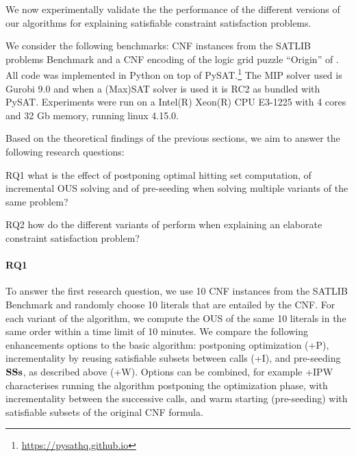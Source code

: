 We now experimentally validate the the performance of the different versions of our algorithms for explaining satisfiable constraint satisfaction problems.

We consider the following benchmarks: CNF instances from the SATLIB problems Benchmark \cite{hoos2000satlib} and a CNF encoding of the logic grid puzzle ``Origin'' of \citet{ecai/BogaertsGCG20}. All code was implemented in Python on top of %
PySAT.\footnote{\url{https://pysathq.github.io}} The MIP solver used is Gurobi 9.0 and when a (Max)SAT solver is used it is RC2 as bundled with PySAT. Experiments were run on a Intel(R) Xeon(R) CPU E3-1225 with 4 cores and 32 Gb memory, running linux 4.15.0.

Based on the theoretical findings of the previous sections, we aim to answer the following research questions:
\begin{compactdesc}
\item[RQ1] what is the effect of postponing optimal hitting set computation, of incremental OUS solving and of pre-seeding \satsets when solving multiple variants of the same problem?
\item[RQ2] how do the different variants of \omus perform when explaining an elaborate constraint satisfaction problem?
\end{compactdesc}


\paragraph{RQ1}
To answer the first research question, we use 10 CNF instances from the SATLIB Benchmark and randomly choose 10 literals that are entailed by the CNF. For each variant of the algorithm, we compute the OUS of the same 10 literals in the same order within a time limit of 10 minutes. 
We compare the following enhancements options to the basic \omus algorithm: postponing optimization (+P), incrementality by reusing satisfiable subsets between \omus calls (+I), and pre-seeding $\mathbf{SSs}$, as described above (+W). Options can be combined, for example \omus+IPW characterises running the \omus algorithm postponing the optimization phase, with incrementality between the successive calls, and warm starting (pre-seeding) with satisfiable subsets of the original CNF formula.

